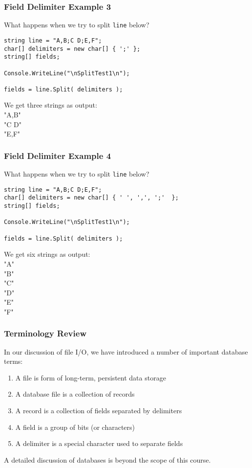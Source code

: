\begin{frame}[fragile]
\frametitle{Field Delimiter Example 3}

What happens when we try to split \texttt{line} below?

\begin{verbatim}
string line = "A,B;C D;E,F";
char[] delimiters = new char[] { ';' };
string[] fields;

Console.WriteLine("\nSplitTest1\n");

fields = line.Split( delimiters );
\end{verbatim}

We get three strings as output:\\
\quad "A,B"\\
\quad "C D"\\
\quad "E,F"

\end{frame}

\begin{frame}[fragile]
\frametitle{Field Delimiter Example 4}

What happens when we try to split \texttt{line} below?

\begin{verbatim}
string line = "A,B;C D;E,F";
char[] delimiters = new char[] { ' ', ',', ';'  };
string[] fields;

Console.WriteLine("\nSplitTest1\n");

fields = line.Split( delimiters );
\end{verbatim}

We get six strings as output:\\
\quad "A"\\
\quad "B"\\
\quad "C"\\
\quad "D"\\
\quad "E"\\
\quad "F"

\end{frame}

\begin{frame}
\frametitle{Terminology Review}

In our discussion of file I/O, we have introduced a number of important database terms:
\begin{enumerate}
\item A \alert{file} is form of long-term, persistent data storage
\item A \alert{database file} is a collection of records
\item A \alert{record} is a collection of fields separated by delimiters
\item A \alert{field} is a group of bits (or characters)
\item A \alert{delimiter} is a special character used to separate fields
\end{enumerate}

A detailed discussion of databases is beyond the scope of this course.

\end{frame}

